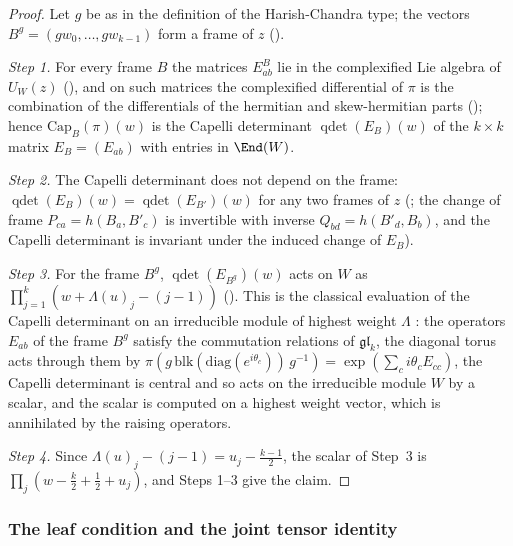 \begin{proof}
Let $g$ be as in the definition of the Harish-Chandra type; the vectors $B^g=(gw_0,\dots,gw_{k-1})$ form a frame of $z$
().

\emph{Step 1.} For every frame $B$ the matrices $E^B_{ab}$ lie in the complexified Lie algebra of $U_W(z)$
(), and on such matrices the complexified differential of $\pi$ is the
combination of the differentials of the hermitian and skew-hermitian parts ();
hence $\mathrm{Cap}_B(\pi)(w)$ is the Capelli determinant $\operatorname{qdet}(E_B)(w)$ of the $k\times k$ matrix
$E_B=(E_{ab})$ with entries in $\End(W)$.

\emph{Step 2.} The Capelli determinant does not depend on the frame: $\operatorname{qdet}(E_B)(w)=\operatorname{qdet}(E_{B'})(w)$
for any two frames of $z$ (; the change of frame $P_{ca}=h(B_a,B'_c)$ is
invertible with inverse $Q_{bd}=h(B'_d,B_b)$, and the Capelli determinant is invariant under the induced change of $E_B$).

\emph{Step 3.} For the frame $B^g$, $\operatorname{qdet}(E_{B^g})(w)$ acts on $W$ as $\prod_{j=1}^k(w+\Lambda(u)_j-(j-1))$
(). This is the classical evaluation of the Capelli determinant on an irreducible
module of highest weight $\Lambda$ \cite{HoweUmeda1991}: the operators $E_{ab}$ of the frame $B^g$ satisfy the commutation relations
of $\mathfrak{gl}_k$, the diagonal torus acts through them by $\pi(g\,\mathrm{blk}(\mathrm{diag}(e^{i\theta_c}))\,g^{-1})=
\exp(\sum_ci\theta_cE_{cc})$, the Capelli determinant is central and so acts on the irreducible module $W$ by a scalar, and the
scalar is computed on a highest weight vector, which is annihilated by the raising operators.

\emph{Step 4.} Since $\Lambda(u)_j-(j-1)=u_j-\frac{k-1}2$, the scalar of Step~3 is $\prod_j(w-\frac k2+\frac12+u_j)$, and Steps
1--3 give the claim.
\end{proof}

\subsubsection{The leaf condition and the joint tensor identity}\label{sec:pf:thmS:joint}

